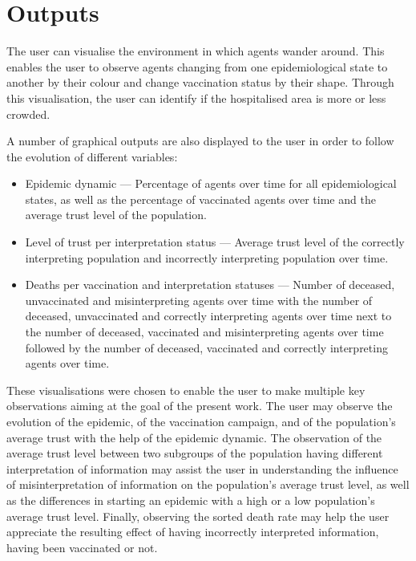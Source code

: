 \section{Outputs}
\label{implementation_outputs}

The user can visualise the environment in which agents wander around. This enables the user to observe agents changing from one epidemiological state to another by their colour and change vaccination status by their shape. Through this visualisation, the user can identify if the hospitalised area is more or less crowded.

A number of graphical outputs are also displayed to the user in order to follow the evolution of different variables:
\begin{itemize}
    \item Epidemic dynamic --- Percentage of agents over time for all epidemiological states, as well as the percentage of vaccinated agents over time and the average trust level of the population.
    \item Level of trust per interpretation status --- Average trust level of the correctly interpreting population and incorrectly interpreting population over time.
    \item Deaths per vaccination and interpretation statuses --- Number of deceased, unvaccinated and misinterpreting agents over time with the number of deceased, unvaccinated and correctly interpreting agents over time next to the number of deceased, vaccinated and misinterpreting agents over time followed by the number of deceased, vaccinated and correctly interpreting agents over time.
\end{itemize}

These visualisations were chosen to enable the user to make multiple key observations aiming at the goal of the present work. The user may observe the evolution of the epidemic, of the vaccination campaign, and of the population's average trust with the help of the epidemic dynamic. The observation of the average trust level between two subgroups of the population having different interpretation of information may assist the user in understanding the influence of misinterpretation of information on the population's average trust level, as well as the differences in starting an epidemic with a high or a low population's average trust level. Finally, observing the sorted death rate may help the user appreciate the resulting effect of having incorrectly interpreted information, having been vaccinated or not.